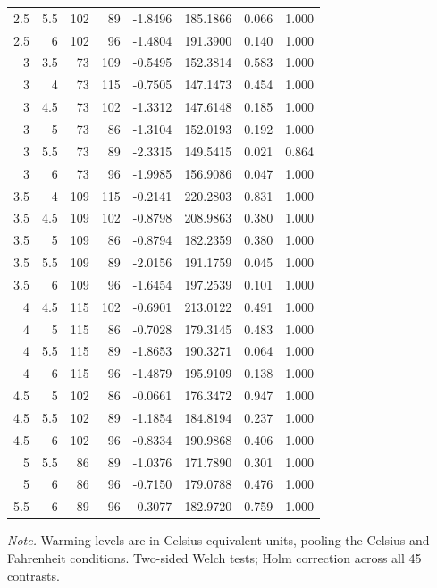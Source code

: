 \documentclass[11pt,a4paper]{article}
\begin{document}
\begin{longtable}{@{}rrrrrrrr@{}}
2.5 & 5.5 & 102 & 89 & -1.8496 & 185.1866 & 0.066 & 1.000 \\
2.5 & 6 & 102 & 96 & -1.4804 & 191.3900 & 0.140 & 1.000 \\
3 & 3.5 & 73 & 109 & -0.5495 & 152.3814 & 0.583 & 1.000 \\
3 & 4 & 73 & 115 & -0.7505 & 147.1473 & 0.454 & 1.000 \\
3 & 4.5 & 73 & 102 & -1.3312 & 147.6148 & 0.185 & 1.000 \\
3 & 5 & 73 & 86 & -1.3104 & 152.0193 & 0.192 & 1.000 \\
3 & 5.5 & 73 & 89 & -2.3315 & 149.5415 & 0.021 & 0.864 \\
3 & 6 & 73 & 96 & -1.9985 & 156.9086 & 0.047 & 1.000 \\
3.5 & 4 & 109 & 115 & -0.2141 & 220.2803 & 0.831 & 1.000 \\
3.5 & 4.5 & 109 & 102 & -0.8798 & 208.9863 & 0.380 & 1.000 \\
3.5 & 5 & 109 & 86 & -0.8794 & 182.2359 & 0.380 & 1.000 \\
3.5 & 5.5 & 109 & 89 & -2.0156 & 191.1759 & 0.045 & 1.000 \\
3.5 & 6 & 109 & 96 & -1.6454 & 197.2539 & 0.101 & 1.000 \\
4 & 4.5 & 115 & 102 & -0.6901 & 213.0122 & 0.491 & 1.000 \\
4 & 5 & 115 & 86 & -0.7028 & 179.3145 & 0.483 & 1.000 \\
4 & 5.5 & 115 & 89 & -1.8653 & 190.3271 & 0.064 & 1.000 \\
4 & 6 & 115 & 96 & -1.4879 & 195.9109 & 0.138 & 1.000 \\
4.5 & 5 & 102 & 86 & -0.0661 & 176.3472 & 0.947 & 1.000 \\
4.5 & 5.5 & 102 & 89 & -1.1854 & 184.8194 & 0.237 & 1.000 \\
4.5 & 6 & 102 & 96 & -0.8334 & 190.9868 & 0.406 & 1.000 \\
5 & 5.5 & 86 & 89 & -1.0376 & 171.7890 & 0.301 & 1.000 \\
5 & 6 & 86 & 96 & -0.7150 & 179.0788 & 0.476 & 1.000 \\
5.5 & 6 & 89 & 96 & 0.3077 & 182.9720 & 0.759 & 1.000 \\
\end{longtable}
{\footnotesize\textit{Note.} Warming levels are in Celsius-equivalent units, pooling the Celsius and Fahrenheit conditions. Two-sided Welch tests; Holm correction across all 45 contrasts.\par}
\endgroup\clearpage
{}\label{tab:3}
\end{document}
